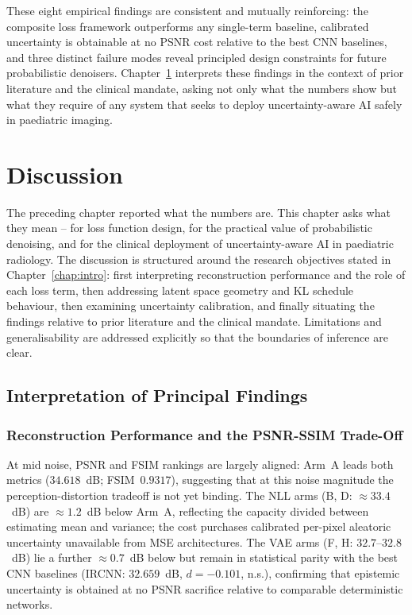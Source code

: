 \documentclass[12pt, a4paper, twoside, openright]{book}
\begin{document}
These eight empirical findings are consistent and mutually reinforcing: the composite loss framework outperforms any single-term baseline, calibrated uncertainty is obtainable at no PSNR cost relative to the best CNN baselines, and three distinct failure modes reveal principled design constraints for future probabilistic denoisers. Chapter~\ref{chap:discussion} interprets these findings in the context of prior literature and the clinical mandate, asking not only what the numbers show but what they require of any system that seeks to deploy uncertainty-aware AI safely in paediatric imaging.

\chapter{Discussion}
\label{chap:discussion}

The preceding chapter reported what the numbers are. This chapter asks what they mean -- for loss function design, for the practical value of probabilistic denoising, and for the clinical deployment of uncertainty-aware AI in paediatric radiology. The discussion is structured around the research objectives stated in Chapter~\ref{chap:intro}: first interpreting reconstruction performance and the role of each loss term, then addressing latent space geometry and KL schedule behaviour, then examining uncertainty calibration, and finally situating the findings relative to prior literature and the clinical mandate. Limitations and generalisability are addressed explicitly so that the boundaries of inference are clear.

\section{Interpretation of Principal Findings}
\label{sec:disc:findings}

\subsection{Reconstruction Performance and the PSNR-SSIM Trade-Off}
\label{sec:disc:findings:psnr}

At mid noise, PSNR and FSIM rankings are largely aligned: Arm~A leads both metrics ($34.618$~dB; FSIM~$0.9317$), suggesting that at this noise magnitude the perception-distortion tradeoff \cite{blau_perception_2018} is not yet binding. The NLL arms (B, D: $\approx 33.4$~dB) are $\approx 1.2$~dB below Arm~A, reflecting the capacity divided between estimating mean and variance; the cost purchases calibrated per-pixel aleatoric uncertainty unavailable from MSE architectures. The VAE arms (F, H: $32.7$--$32.8$~dB) lie a further $\approx 0.7$~dB below but remain in statistical parity with the best CNN baselines (IRCNN: $32.659$~dB, $d=-0.101$, n.s.), confirming that epistemic uncertainty is obtained at no PSNR sacrifice relative to comparable deterministic networks.
\end{document}
